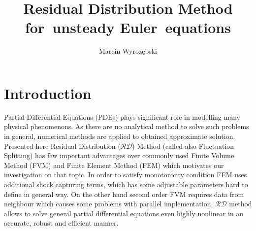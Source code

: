 \documentclass[plainboxedsections, 17pt, b1]{sciposter}
\title{Residual Distribution Method for~unsteady Euler~equations}
\author{Marcin Wyrozębski}
\institute{Department of Aerodynamics\\
Institute of Aeronautics and Applied Mechanics \\
Warsaw University of Technology 
}
\newcommand{\rd}{$\mathcal{RD}$}
\begin{document}
\pagestyle{fancy}

\maketitle


\section{Introduction }

Partial Differential Equations (PDEs) plays significant role in modelling many physical phenomenons. As there are no analytical method to solve such problems in general, numerical methods are applied to obtained approximate solution. Presented here Residual Distribution (\rd{}) Method (called also Fluctuation Splitting) has few important advantages over commonly used Finite Volume Method (FVM) and Finite Element Method (FEM) which motivates our investigation on that topic. In order to satisfy monotonicity condition FEM uses additional shock capturing terms, which has some adjustable parameters hard to define in general way. On the other hand second order FVM requires data from neighbour which causes some problems with parallel implementation. \rd{} method allows to solve general partial differential equations even highly nonlinear in an accurate, robust and efficient manner.
\end{document}
